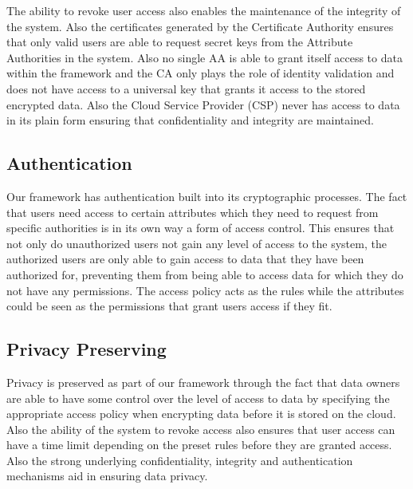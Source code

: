 The ability to revoke user access also enables the maintenance of the integrity of the system. Also the certificates generated by the Certificate Authority ensures that only valid users are able to request secret keys from the Attribute Authorities in the system. Also no single AA is able to grant itself access to data within the framework and the CA only plays the role of identity validation and does not have access to a universal key that grants it access to the stored encrypted data. Also the Cloud Service Provider (CSP) never has access to data in its plain form ensuring that confidentiality and integrity are maintained.

\subsection*{Authentication}

Our framework has authentication built into its cryptographic processes. The fact that users need access to certain attributes which they need to request from specific authorities is in its own way a form of access control. This ensures that not only do unauthorized users not gain any level of access to the system, the authorized users are only able to gain access to data that they have been authorized for, preventing them from being able to access data for which they do not have any permissions. The access policy acts as the rules while the attributes could be seen as the permissions that grant users access if they fit.

\subsection*{Privacy Preserving}

Privacy is preserved as part of our framework through the fact that data owners are able to have some control over the level of access to data by specifying the appropriate access policy when encrypting data before it is stored on the cloud. Also the ability of the system to revoke access also ensures that user access can have a time limit depending on the preset rules before they are granted access. Also the strong underlying confidentiality, integrity and authentication mechanisms aid in ensuring data privacy.
